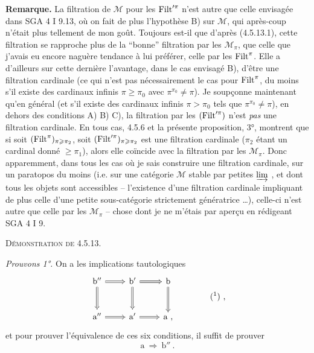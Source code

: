 \textbf{Remarque.} La filtration de $\mathcal{M}$ pour les $\operatorname{Filt}'^{\pi}$ n'est autre que celle envisagée dans SGA 4 I 9.13, où on fait de plus l'hypothèse B) sur $\mathcal{M}$, qui après-coup n'était plus tellement de mon goût. Toujours est-il que d'après (4.5.13.1), cette filtration se rapproche plus de la ``bonne'' filtration par les $\mathcal{M}_{\pi}$, que celle que j'avais eu encore naguère tendance à lui préférer, celle par les $\operatorname{Filt}^{\pi}$. Elle a d'ailleurs sur cette dernière l'avantage, dans le cas envisagé B), d'être une filtration cardinale (ce qui n'est pas nécessairement le cas pour $\operatorname{Filt}^{\pi}$, du moins s'il existe des cardinaux infinis $\pi \geqslant \pi_0$ avec $\pi^{\pi_0} \neq \pi$). Je soupçonne maintenant qu'en général (et s'il existe des cardinaux infinis $\pi > \pi_0$ tels que $\pi^{\pi_0} \neq \pi$), en dehors des conditions A) B) C), la filtration par les $(\operatorname{Filt}'^{\pi})$ n'est \textit{pas} une
filtration cardinale. En tous cas, 4.5.6 et la présente proposition, 3°, montrent que si soit $(\operatorname{Filt}^{\pi})_{\pi\geqslant\pi_2}$, soit $(\operatorname{Filt}'^{\pi})_{\pi\geqslant\pi_2}$ est une filtration cardinale ($\pi_2$ étant un cardinal donné $\geqslant \pi_1$), alors elle coïncide avec la filtration par les $\mathcal{M}_{\pi}$. Donc apparemment, dans tous les cas où je sais construire une filtration cardinale, sur un paratopos du moins (i.e. sur une catégorie $\mathcal{M}$ stable par petites $\varinjlim$ , et dont tous les objets sont accessibles -- l'existence d'une filtration cardinale impliquant de plus celle d'une petite sous-catégorie strictement génératrice \dots), celle-ci n'est autre que celle par les $\mathcal{M}_{\pi}$ -- chose dont je ne m'étais par aperçu en rédigeant SGA 4 I 9. %

\textsc{Démonstration de 4.5.13.}

\textit{Prouvons 1°.} On a les implications tautologiques
\[
\begin{tikzcd}[row sep=large]
\mathrm{b}'' \arrow[r, Rightarrow] \arrow[d, Rightarrow] & \mathrm{b}' \arrow[r, Rightarrow] \arrow[d, Rightarrow] & \mathrm{b} \arrow[d, Rightarrow] \\
\mathrm{a}'' \arrow[r, Rightarrow] & \mathrm{a}' \arrow[r, Rightarrow] & \mathrm{a} \text{ ,}
\end{tikzcd}
\qquad\qquad \text{(\footnotemark) ,}
\]
et pour prouver l'équivalence de ces six conditions, il suffit de prouver
\[ \mathrm{a} \ \Longrightarrow \ \mathrm{b}'' \ . \]

